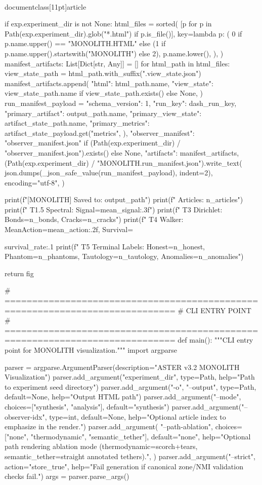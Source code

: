 \\documentclass[11pt]{article}
\begin{document}
\begin{CodeBlock}
{{{{{{    if exp.experiment_dir is not None:
        html_files = sorted(
            [p for p in Path(exp.experiment_dir).glob("*.html") if p.is_file()],
            key=lambda p: (
                0 if p.name.upper() == "MONOLITH.HTML" else (1 if p.name.upper().startswith("MONOLITH") else 2),
                p.name.lower(),
            ),
        )
        manifest_artifacts: List[Dict[str, Any]] = []
        for html_path in html_files:
            view_state_path = html_path.with_suffix(".view_state.json")
            manifest_artifacts.append(
                {
                    "html": html_path.name,
                    "view_state": view_state_path.name if view_state_path.exists() else None,
                }
            )
        run_manifest_payload = {
            "schema_version": 1,
            "run_key": dash_run_key,
            "primary_artifact": output_path.name,
            "primary_view_state": artifact_state_path.name,
            "primary_metrics": artifact_state_payload.get("metrics", {}),
            "observer_manifest": "observer_manifest.json" if (Path(exp.experiment_dir) / "observer_manifest.json").exists() else None,
            "artifacts": manifest_artifacts,
        }
        (Path(exp.experiment_dir) / "MONOLITH.run_manifest.json").write_text(
            json.dumps(_json_safe_value(run_manifest_payload), indent=2),
            encoding="utf-8",
        )

    print(f"[MONOLITH] Saved to: {output_path}")
    print(f"  Articles: {n_articles}")
    print(f"  T1.5 Spectral: Signal={mean_signal:.3f}")
    print(f"  T3 Dirichlet: Bonds={n_bonds}, Cracks={n_cracks}")
    print(f"  T4 Walker: MeanAction={mean_action:.2f}, Survival={survival_rate:.1%
    print(f"  T5 Terminal Labels: Honest={n_honest}, Phantom={n_phantoms}, Tautology={n_tautology}, Anomalies={n_anomalies}")

    return fig


# =============================================================================
# CLI ENTRY POINT
# =============================================================================
def main():
    """CLI entry point for MONOLITH visualization."""
    import argparse

    parser = argparse.ArgumentParser(description="ASTER v3.2 MONOLITH Visualization")
    parser.add_argument("experiment_dir", type=Path, help="Path to experiment seed directory")
    parser.add_argument("-o", "--output", type=Path, default=None, help="Output HTML path")
    parser.add_argument("--mode", choices=["synthesis", "analysis"], default="synthesis")
    parser.add_argument("--observer-idx", type=int, default=None, help="Optional article index to emphasize in the render.")
    parser.add_argument(
        "--path-ablation",
        choices=["none", "thermodynamic", "semantic_tether"],
        default="none",
        help="Optional path rendering ablation mode (thermodynamic=scorch+tears, semantic_tether=straight annotated tethers).",
    )
    parser.add_argument("--strict", action="store_true",
                        help="Fail generation if canonical zone/NMI validation checks fail.")
    args = parser.parse_args()

}}}}}}}
\end{CodeBlock}
\end{document}
